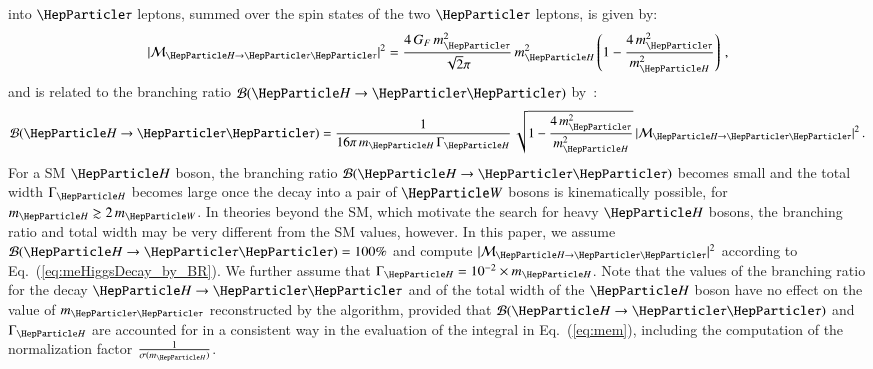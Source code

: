 into $\Pgt$ leptons, summed over the spin states of the two $\Pgt$ leptons, is given by:
\begin{equation}
\vert \mathcal{M}_{\PHiggs \to \Pgt\Pgt} \vert^{2} = 
 \frac{4 \, G_{F} \, m_{\Pgt}^{2}}{\sqrt{2}\pi} \, m_{\PHiggs}^{2} \left( 1 - \frac{4 \, m_{\Pgt}^{2}}{m_{\PHiggs}^{2}} \right) \, ,
\label{eq:meHiggsDecay}
\end{equation}
and is related to the branching ratio $\mathcal{B}(\PHiggs \to \Pgt\Pgt)$
by~\cite{me_HtoTauTau}:
\begin{equation}
\mathcal{B}(\PHiggs \to \Pgt\Pgt) 
 = \frac{1}{16\pi \, m_{\PHiggs} \, \Gamma_{\PHiggs}} \, \sqrt{1 - \frac{4 \, m_{\Pgt}^{2}}{m_{\PHiggs}^{2}}} \, \vert \mathcal{M}_{\PHiggs \to \Pgt\Pgt} \vert^{2} \, .
\label{eq:meHiggsDecay_by_BR}
\end{equation}
For a SM $\PHiggs$ boson,
the branching ratio $\mathcal{B}(\PHiggs \to \Pgt\Pgt)$ becomes small and the total width $\Gamma_{\PHiggs}$ becomes large
once the decay into a pair of $\PW$ bosons is kinematically possible,
\ie for $m_{\PHiggs} \gtrsim 2 \, m_{\PW}$.
In theories beyond the SM, which motivate the search for heavy $\PHiggs$ bosons,
the branching ratio and total width may be very different from the SM
values, however.
In this paper, we assume $\mathcal{B}(\PHiggs \to \Pgt\Pgt) = 100\%$ and compute $\vert \mathcal{M}_{\PHiggs \to \Pgt\Pgt} \vert^{2}$ according to Eq.~(\ref{eq:meHiggsDecay_by_BR}).
We further assume that $\Gamma_{\PHiggs} = 10^{-2} \times m_{\PHiggs}$.
Note that the values of the branching ratio for the decay $\PHiggs \to \Pgt\Pgt$ and of the total width of the $\PHiggs$ boson
have no effect on the value of $m_{\Pgt\Pgt}$ reconstructed by the algorithm, 
provided that $\mathcal{B}(\PHiggs \to \Pgt\Pgt)$ and $\Gamma_{\PHiggs}$ are accounted for in
a consistent way in the evaluation of the integral in
Eq.~(\ref{eq:mem}), including the computation of the normalization factor $\frac{1}{\sigma(m_{\PHiggs})}$.

